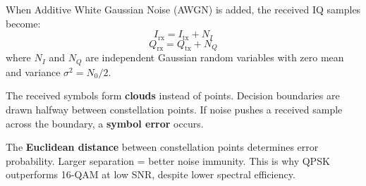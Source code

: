 When Additive White Gaussian Noise (AWGN) is added, the received IQ samples become:
\begin{equation}
I_{\mathrm{rx}} = I_{\mathrm{tx}} + N_I
\end{equation}
\begin{equation}
Q_{\mathrm{rx}} = Q_{\mathrm{tx}} + N_Q
\end{equation}
where $N_I$ and $N_Q$ are independent Gaussian random variables with zero mean and variance $\sigma^2 = N_0/2$.

\begin{center}
\end{center}

The received symbols form \textbf{clouds} instead of points. Decision boundaries are drawn halfway between constellation points. If noise pushes a received sample across the boundary, a \textbf{symbol error} occurs.

\begin{keyconcept}
The \textbf{Euclidean distance} between constellation points determines error probability. Larger separation = better noise immunity. This is why QPSK outperforms 16-QAM at low SNR, despite lower spectral efficiency.
\end{keyconcept}

